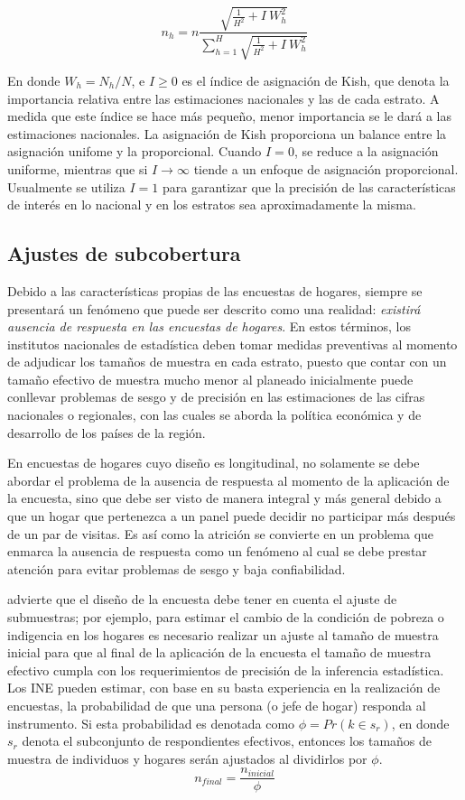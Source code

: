 \documentclass[
  12pt,
]{book}
\begin{document}
\[
n_h=n\frac{\sqrt{\frac{1}{H^2}+I\ W_h^2}}{\sum_{h=1}^{H}\sqrt{\frac{1}{H^2}+I\ W_h^2}}
\]

En donde \(W_h=N_h/N\), e \(I \geq 0\) es el índice de asignación de Kish, que denota la importancia relativa entre las estimaciones nacionales y las de cada estrato. A medida que este índice se hace más pequeño, menor importancia se le dará a las estimaciones nacionales. La asignación de Kish proporciona un balance entre la asignación unifome y la proporcional. Cuando \(I=0\), se reduce a la asignación uniforme, mientras que si \(I \rightarrow \infty\) tiende a un enfoque de asignación proporcional. Usualmente se utiliza \(I = 1\) para garantizar que la precisión de las características de interés en lo nacional y en los estratos sea aproximadamente la misma.

\hypertarget{ajustes-de-subcobertura}{%
\subsection{Ajustes de subcobertura}\label{ajustes-de-subcobertura}}

Debido a las características propias de las encuestas de hogares, siempre se presentará un fenómeno que puede ser descrito como una realidad: \emph{existirá ausencia de respuesta en las encuestas de hogares}. En estos términos, los institutos nacionales de estadística deben tomar medidas preventivas al momento de adjudicar los tamaños de muestra en cada estrato, puesto que contar con un tamaño efectivo de muestra mucho menor al planeado inicialmente puede conllevar problemas de sesgo y de precisión en las estimaciones de las cifras nacionales o regionales, con las cuales se aborda la política económica y de desarrollo de los países de la región.

En encuestas de hogares cuyo diseño es longitudinal, no solamente se debe abordar el problema de la ausencia de respuesta al momento de la aplicación de la encuesta, sino que debe ser visto de manera integral y más general debido a que un hogar que pertenezca a un panel puede decidir no participar más después de un par de visitas. Es así como la atrición se convierte en un problema que enmarca la ausencia de respuesta como un fenómeno al cual se debe prestar atención para evitar problemas de sesgo y baja confiabilidad.

\citet{Kalton_2009} advierte que el diseño de la encuesta debe tener en cuenta el ajuste de submuestras; por ejemplo, para estimar el cambio de la condición de pobreza o indigencia en los hogares es necesario realizar un ajuste al tamaño de muestra inicial para que al final de la aplicación de la encuesta el tamaño de muestra efectivo cumpla con los requerimientos de precisión de la inferencia estadística. Los INE pueden estimar, con base en su basta experiencia en la realización de encuestas, la probabilidad de que una persona (o jefe de hogar) responda al instrumento. Si esta probabilidad es denotada como \(\phi=Pr(k \in s_r)\), en donde \(s_r\) denota el subconjunto de respondientes efectivos, entonces los tamaños de muestra de individuos y hogares serán ajustados al dividirlos por \(\phi\).
\[n_{final} = \frac{n_{inicial}}{\phi}\]
\end{document}
